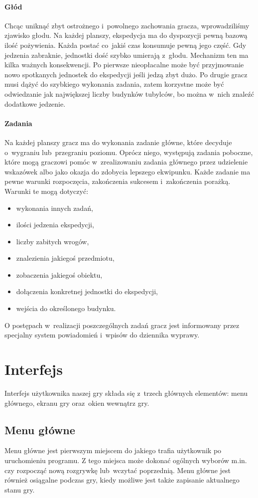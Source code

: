\documentclass[licencjacka]{pracamgr}
\begin{document}
      \paragraph{Głód}
	Chcąc uniknąć zbyt ostrożnego i~powolnego zachowania gracza, wprowadziliśmy zjawisko głodu. Na każdej planszy, ekspedycja ma do dyspozycji pewną
	bazową ilość pożywienia. Każda postać co~jakiś czas konsumuje pewną jego część. Gdy jedzenia zabraknie, jednostki dość szybko
	umierają z~głodu. Mechanizm ten ma kilka ważnych konsekwencji. Po pierwsze nieopłacalne może być przyjmowanie nowo spotkanych jednostek do ekspedycji
	jeśli jedzą zbyt dużo. Po drugie gracz musi dążyć do szybkiego wykonania zadania, zatem korzystne może być odwiedzanie jak największej liczby budynków
	tubylców, bo można w~nich znaleźć dodatkowe jedzenie.
      \paragraph{Zadania}
	Na każdej planszy gracz ma do wykonania zadanie główne, które decyduje o~wygraniu lub~przegraniu poziomu. Oprócz niego,
	występują zadania poboczne, które mogą graczowi pomóc w~zrealizowaniu zadania głównego przez udzielenie wskazówek albo jako okazja do zdobycia lepszego
	ekwipunku. Każde zadanie ma pewne warunki rozpoczęcia, zakończenia sukcesem i~zakończenia porażką. Warunki te mogą dotyczyć:
	\begin{itemize}
	 \item wykonania innych zadań,
	 \item ilości jedzenia ekspedycji,
	 \item liczby zabitych wrogów,
	 \item znalezienia jakiegoś przedmiotu,
	 \item zobaczenia jakiegoś obiektu,
	 \item dołączenia konkretnej jednostki do ekspedycji,
	 \item wejścia do określonego budynku.
	\end{itemize}
	O postępach w~realizacji poszczególnych zadań gracz jest informowany przez specjalny system powiadomień i~wpisów do dziennika wyprawy.


  \section{Interfejs}
    Interfejs użytkownika naszej gry składa się z~trzech głównych elementów: menu głównego, ekranu gry oraz~okien wewnątrz gry.

    \subsection{Menu główne}
      Menu główne jest pierwszym miejscem do jakiego trafia użytkownik po uruchomieniu programu. Z tego miejsca może dokonać ogólnych wyborów m.in. czy
      rozpocząć nową rozgrywkę lub~wczytać poprzednią. Menu główne jest również osiągalne podczas gry, kiedy możliwe jest także zapisanie aktualnego stanu gry.
\end{document}
